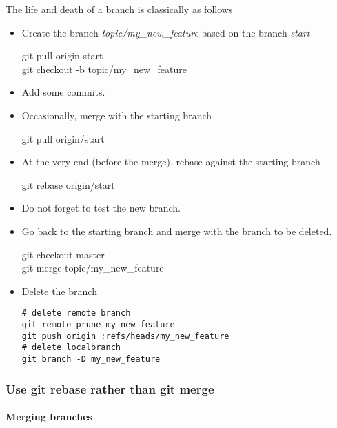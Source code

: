 The life and death of a branch is classically as  follows
\begin{itemize}
\item Create the branch \textit{topic/my\_new\_feature} based on the branch \textit{start}\\
\begin{tt}
git pull origin start\\
git checkout -b topic/my\_new\_feature
\end{tt}

\item Add some commits.

\item  Occasionally, merge with the starting branch\\
\begin{tt}
git pull origin/start
\end{tt}

\item At the very end (before the merge), rebase against the starting branch \\
\begin{tt}
git rebase origin/start
\end{tt}

\item  Do not forget to test the new branch.\\

\item  Go back to the starting branch and merge with the branch to be deleted.\\
\begin{tt}
git checkout master\\
git merge topic/my\_new\_feature
\end{tt}

\item  Delete the branch
\begin{verbatim}
# delete remote branch
git remote prune my_new_feature
git push origin :refs/heads/my_new_feature
# delete localbranch
git branch -D my_new_feature
\end{verbatim}
\end{itemize}


\subsubsection{Use git rebase rather than git merge}

\paragraph{Merging branches}

